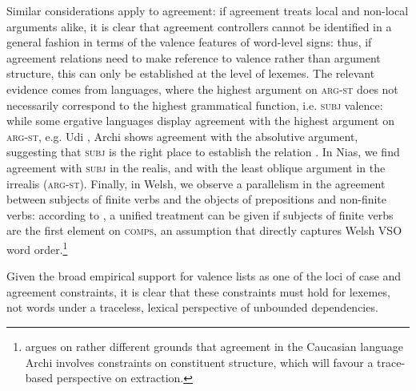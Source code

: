 \documentclass[output=paper
                ,modfonts
                ,nonflat
	        ,collection
	        ,collectionchapter
	        ,collectiontoclongg
 	        ,biblatex
                ,babelshorthands
                ,newtxmath
                ,draftmode
                ,colorlinks, citecolor=brown
]{./langsci/langscibook}
\begin{document}
{Similar considerations apply to agreement: if agreement treats local
and non-local arguments alike, it is clear that agreement controllers
cannot be identified in a general fashion in terms of the valence
features of word-level signs: thus, if agreement relations need to make
reference to valence rather than argument structure, this can only be
established at the level of lexemes. The relevant evidence comes from
languages, where the highest argument on \textsc{arg-st} does not
necessarily correspond to the highest grammatical function, i.e.
\textsc{subj} valence: while some ergative languages display agreement
with the highest argument on \textsc{arg-st}, e.g. Udi
\citep{harris_a84udi}, Archi \citep{kibrik94:_archi} shows agreement
with the absolutive argument, suggesting that \textsc{subj} is the
right place to establish the relation
\citep{Crysmann:09}. %
In Nias, we find agreement with \textsc{subj} in the realis, and with
the least oblique argument in the irrealis (\textsc{arg-st}). Finally,
in Welsh, we observe a parallelism in the agreement between subjects
of finite verbs and the objects of prepositions and non-finite verbs:
according to \citet{Borsley89}, a unified treatment can be given if
subjects of finite verbs are the first element on \textsc{comps}, an
assumption that directly captures Welsh VSO word order.\footnote{
  \citet{Borsley:16:Archi} argues on rather different grounds that
  agreement in the Caucasian language Archi involves constraints on
  constituent structure, which will favour a trace-based perspective on
  extraction. }

Given the broad empirical support for valence lists as one of the loci
of case and agreement constraints, it is clear that these constraints
must hold for lexemes, not words under a traceless, lexical
perspective of unbounded dependencies.









}
\end{document}
